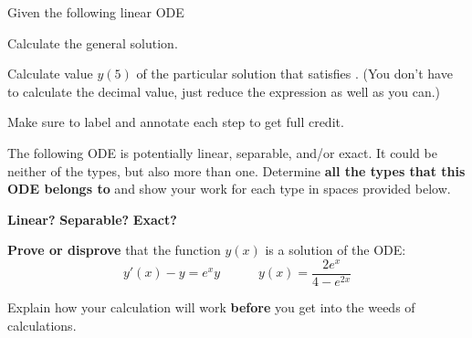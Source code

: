 \documentclass[10pt,twoside,sfsidenotes]{tufte-handout}
\begin{document}
\begin{fullwidth}
  \begin{question}
    Given the following linear ODE \vary{\[ \frac{dy}{dx} + x y(x) = x\]}{\[ x^{2}\frac{dy}{dx} + x y(x) = 1\]}
    \begin{compactenum}[(a)]
      \item Calculate the general solution.
      \item Calculate value \(y(5)\) of the particular solution that satisfies .
      (You don't have to calculate the decimal value, just reduce the expression as well as you can.)
    \end{compactenum}
    Make sure to label and annotate each step to get full credit.
  \end{question}
\end{fullwidth}

\clearpage

\begin{fullwidth}
  \begin{question}
    The following ODE is potentially linear, separable, and/or exact. It could be neither of the types, but also more than one.
    Determine \textbf{all the types that this ODE belongs to} and show your work for each type in spaces provided below.
    \vary{\[x^{2} \frac{dy}{dx} + 2x y(x) = \sin(x)\]}{\[(2+x+ye^{y})y'(x)=-e^{x} - y\]}
  \end{question}
\end{fullwidth}
\vspace{2em}
\noindent\textbf{Linear?}
\vfill
\noindent\textbf{Separable?}
\vfill
\noindent\textbf{Exact?}
\vfill

\clearpage
\begin{fullwidth}
  \begin{question}
    \textbf{Prove or disprove} that the function \(y(x)\) is a solution of the ODE:
    \vary{\[x \frac{dy}{dx} + y = x^{2}y^{2} \quad\quad\quad y(x) = \frac{1}{-x^{2} + x}\]}
        {\[y'(x)-y = e^{x}y \quad\quad\quad y(x) = \frac{2e^{x}}{4-e^{2x}}\]}

      Explain how your calculation will work \textbf{before} you get into the weeds of calculations.
  \end{question}
\end{fullwidth}
\end{document}
